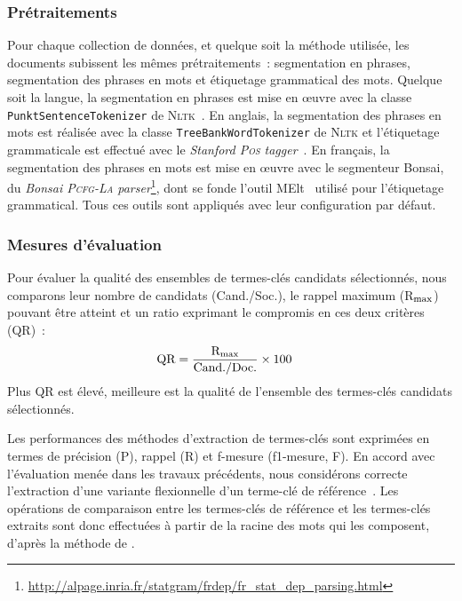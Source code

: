       \subsubsection{Prétraitements}
      \label{subsubsec:main-automatic_keyphrase_annotation-keyphrase_candidate_selection-evaluation-preprocessing}
        Pour chaque collection de données, et quelque soit la méthode utilisée,
        les documents subissent les mêmes prétraitements~: segmentation en
        phrases, segmentation des phrases en mots et étiquetage grammatical des
        mots. Quelque soit la langue, la segmentation en phrases est mise en
        \oe{}uvre avec la classe \texttt{PunktSentenceTokenizer} de
        \textsc{Nltk}~\cite{bird2009nltk}. En anglais, la segmentation des
        phrases en mots est réalisée avec la classe
        \texttt{TreeBankWordTokenizer} de \textsc{Nltk} et l'étiquetage
        grammaticale est effectué avec le \textit{Stanford \textsc{Pos}
        tagger}~\cite{toutanova2003stanfordpostagger}. En français, la
        segmentation des phrases en mots est mise en \oe{}uvre avec le
        segmenteur Bonsai, du \textit{Bonsai \textsc{Pcfg-La}
        parser}\footnote{\url{http://alpage.inria.fr/statgram/frdep/fr_stat_dep_parsing.html}},
        dont se fonde l'outil MElt~\cite{denis2009melt} utilisé pour
        l'étiquetage grammatical. Tous ces outils sont appliqués avec leur
        configuration par défaut.
      
      \subsubsection{Mesures d'évaluation}
      \label{subsubsec:main-automatic_keyphrase_annotation-keyphrase_candidate_selection-evaluation-evaluation_measures}
        Pour évaluer la qualité des ensembles de termes-clés candidats
        sélectionnés, nous comparons leur nombre de candidats (Cand./Soc.), le
        rappel maximum (R$_\textnormal{max}$) pouvant être atteint et un ratio
        exprimant le compromis en ces deux critères (QR)~:
        \begin{align}
          \textnormal{QR} &= \frac{\textnormal{R}_{\textnormal{max}}}{\textnormal{Cand./Doc.}} \times 100
        \end{align}
        Plus QR est élevé, meilleure est la qualité de l'ensemble des
        termes-clés candidats sélectionnés.

        Les performances des méthodes d'extraction de termes-clés sont exprimées
        en termes de précision (P), rappel (R) et f-mesure (f1-mesure, F). En
        accord avec l'évaluation menée dans les travaux précédents, nous
        considérons correcte l'extraction d'une variante flexionnelle d'un
        terme-clé de référence~\cite{kim2010semeval}. Les opérations de
        comparaison entre les termes-clés de référence et les termes-clés
        extraits sont donc effectuées à partir de la racine des mots qui les
        composent, d'après la méthode de .

